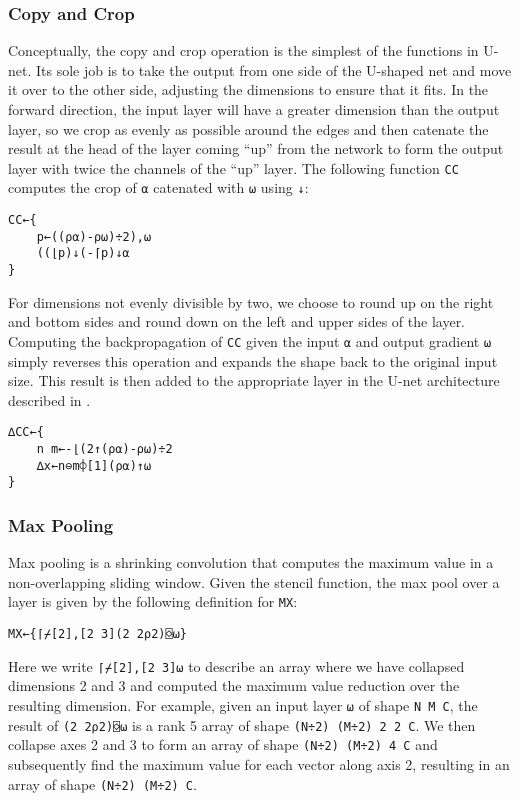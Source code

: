 \documentclass[10pt,twocolumn,english,format=sigplan,screen,balance]{acmart}
\begin{document}
\subsubsection{Copy and Crop}

Conceptually, the copy and crop operation is the simplest of the functions
in U-net. Its sole job is to take the output from one side of the
U-shaped net and move it over to the other side, adjusting the dimensions
to ensure that it fits. In the forward direction, the input layer
will have a greater dimension than the output layer, so we crop as
evenly as possible around the edges and then catenate the result at
the head of the layer coming “up” from the network to form the
output layer with twice the channels of the “up” layer. The
following function \texttt{CC} computes the crop of \texttt{⍺} catenated
with \texttt{⍵} using \texttt{↓}:
\begin{verbatim}
CC←{
    p←((⍴⍺)-⍴⍵)÷2),⍵
    ((⌊p)↓(-⌈p)↓⍺
}
\end{verbatim}
For dimensions not evenly divisible by two, we choose to round up
on the right and bottom sides and round down on the left and upper
sides of the layer. Computing the backpropagation of \texttt{CC} given
the input \texttt{⍺} and output gradient \texttt{⍵} simply reverses
this operation and expands the shape back to the original input size.
This result is then added to the appropriate layer in the U-net architecture
described in . 
\begin{verbatim}
∆CC←{
    n m←-⌊(2↑(⍴⍺)-⍴⍵)÷2
    ∆x←n⊖m⌽[1](⍴⍺)↑⍵
}
\end{verbatim}

\subsubsection{Max Pooling}

Max pooling is a shrinking convolution that computes the maximum value
in a non-overlapping sliding window. Given the stencil function, the
max pool over a layer is given by the following definition for \texttt{MX}:
\begin{verbatim}
MX←{⌈⌿[2],[2 3](2 2⍴2)⌺⍵}
\end{verbatim}
Here we write \texttt{⌈⌿{[}2{]},{[}2 3{]}⍵} to describe an array where
we have collapsed dimensions 2 and 3 and computed the maximum value
reduction over the resulting dimension. For example, given an input
layer \texttt{⍵} of shape \texttt{N M C}, the result of \texttt{(2
2⍴2)⌺⍵} is a rank 5 array of shape \texttt{(N÷2) (M÷2) 2 2 C}. We
then collapse axes 2 and 3 to form an array of shape \texttt{(N÷2)
(M÷2) 4 C} and subsequently find the maximum value for each vector
along axis 2, resulting in an array of shape \texttt{(N÷2) (M÷2) C}.
\end{document}
